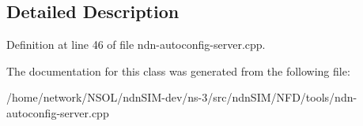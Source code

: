 \subsection{Detailed Description}


Definition at line 46 of file ndn-\/autoconfig-\/server.\+cpp.



The documentation for this class was generated from the following file\+:\begin{DoxyCompactItemize}
\item 
/home/network/\+N\+S\+O\+L/ndn\+S\+I\+M-\/dev/ns-\/3/src/ndn\+S\+I\+M/\+N\+F\+D/tools/ndn-\/autoconfig-\/server.\+cpp\end{DoxyCompactItemize}
